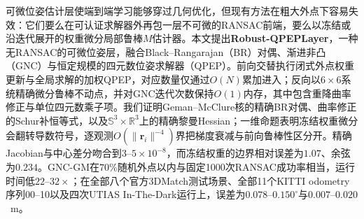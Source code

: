 可微位姿估计层使端到端学习能够穿过几何优化，但现有方法在粗大外点下容易失效：它们要么在可认证求解器外再包一层不可微的RANSAC前端，要么以冻结或沿迭代展开的权重微分局部鲁棒$M$估计器。本文提出\textbf{Robust-QPEPLayer}，一种无RANSAC的可微位姿层，融合Black--Rangarajan（BR）对偶、渐进非凸（GNC）与恒定规模的四元数位姿求解器（QPEP）。前向交替执行闭式外点权重更新与全局求解的加权QPEP，对应数量仅通过$O(N)$累加进入；反向以$6\times6$系统精确微分鲁棒不动点，并对GNC迭代次数保持$O(1)$内存，其中包含重降曲率修正与单位四元数乘子项。我们证明Geman--McClure核的精确BR对偶、曲率修正的Schur补恒等式，以及$\mathbb{S}^3\times\mathbb{R}^3$上的精确黎曼Hessian；一维命题表明冻结权重微分会翻转导数符号，逐观测$O(\|\mathbf{r}_i\|^{-4})$界把梯度衰减与前向鲁棒性区分开。精确Jacobian与中心差分吻合到$3$--$5\times10^{-8}$，而冻结权重的边界相对误差为$1.07$、余弦为$0.234$。GNC-GM在$70\%$随机外点以内与固定1000次RANSAC成功率相当，运行时间低$22$--$32\times$；在全部八个官方3DMatch测试场景、全部11个KITTI odometry序列00--10以及四次UTIAS In-The-Dark运行上，误差为$0.078$--$0.150^\circ$与$0.007$--$0.020$~m。

